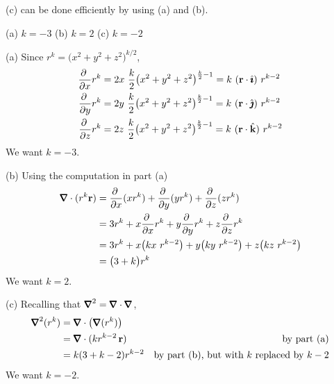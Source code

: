 \begin{hint} 
(c) can be done efficiently by using (a) and (b).
\end{hint}

\begin{answer} 
(a) $k=-3$\qquad
(b) $k=2$\qquad
(c) $k=-2$
\end{answer}

\begin{solution} (a)
Since $r^k=\big(x^2+y^2+z^2\big)^{k/2}$,
\begin{align*}
\pdiff{}{x} r^k 
   & = 2x\ \frac{k}{2}\big(x^2+y^2+z^2\big)^{\frac{k}{2}-1}
     = k\ (\vr\cdot\hi)\ r^{k-2} \\
\pdiff{}{y} r^k 
   & = 2y\ \frac{k}{2}\big(x^2+y^2+z^2\big)^{\frac{k}{2}-1}
     = k\ (\vr\cdot\hj)\ r^{k-2} \\
\pdiff{}{z} r^k 
   & = 2z\ \frac{k}{2}\big(x^2+y^2+z^2\big)^{\frac{k}{2}-1}
     = k\ (\vr\cdot\hk)\ r^{k-2} 
\end{align*}
We want $k=-3$.

(b) Using the computation in part (a)
\begin{align*}
\vnabla  \cdot (r^k\vr) 
&= \pdiff{}{x} (x r^k)
  + \pdiff{}{y} (y r^k)
  + \pdiff{}{z} (z r^k) \\
&= 3r^k + x \pdiff{}{x} r^k
  + y \pdiff{}{y} r^k
  + z \pdiff{}{z} r^k \\
&= 3r^k + x \big(kx\ r^{k-2}\big)
  + y \big(ky\ r^{k-2}\big)
  + z \big(kz\ r^{k-2}\big) \\
&= \big(3+k\big)r^k
\end{align*}
We want $k=2$.

(c) Recalling that 
$\vnabla^2 = \vnabla\cdot\vnabla$,
\begin{align*}
\vnabla^2 (r^k )
&=\vnabla\cdot\big(\vnabla(r^k)\big) \\
&=\vnabla\cdot(k r^{k-2}\,\vr) &\text{by part (a)} \\
&=k(3+k-2)r^{k-2} &\text{by part (b),  but with $k$ replaced by $k-2$} 
\end{align*}
We want $k=-2$.



\end{solution}

